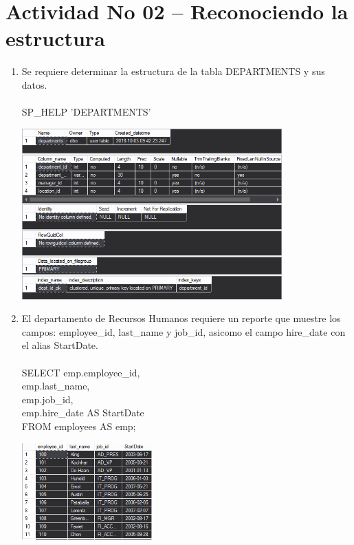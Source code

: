 \section{Actividad No 02 – Reconociendo la estructura} 

\begin{enumerate}[1.]
	\item Se requiere determinar la estructura de la tabla DEPARTMENTS y sus datos.
	\\
	\\SP\_HELP 'DEPARTMENTS'

	\begin{center}
	\includegraphics[width=10cm]{./Imagenes/421} 
	\end{center}

	\item El departamento de Recursos Humanos requiere un reporte que muestre los campos: employee\_id, last\_name y job\_id, asicomo el campo hire\_date con el alias StartDate.
	\\
	\\SELECT emp.employee\_id, \\
	emp.last\_name, \\
	emp.job\_id, \\
	emp.hire\_date AS StartDate \\
	FROM employees AS emp; 

	\begin{center}
	\includegraphics[width=5cm]{./Imagenes/422} 
	\end{center}


\end{enumerate}
